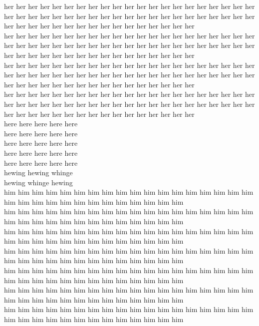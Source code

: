 her her her her her her her her her her her her her her her her her her her her her her her her her her her her her her her her her her her her her her her her her her her her her her her her her her her her her her her her her her\\
her her her her her her her her her her her her her her her her her her her her her her her her her her her her her her her her her her her her her her her her her her her her her her her her her her her her her her her her her her\\
her her her her her her her her her her her her her her her her her her her her her her her her her her her her her her her her her her her her her her her her her her her her her her her her her her her her her her her her her her\\
her her her her her her her her her her her her her her her her her her her her her her her her her her her her her her her her her her her her her her her her her her her her her her her her her her her her her her her her her her\\
here here here here here\\
here here here here here\\
here here here here here\\
here here here here here\\
here here here here here\\
hewing hewing whinge\\
hewing whinge hewing\\
him him him him him him him him him him him him him him him him him him him him him him him him him him him him him him him\\
him him him him him him him him him him him him him him him him him him him him him him him him him him him him him him him\\
him him him him him him him him him him him him him him him him him him him him him him him him him him him him him him him\\
him him him him him him him him him him him him him him him him him him him him him him him him him him him him him him him\\
him him him him him him him him him him him him him him him him him him him him him him him him him him him him him him him\\
him him him him him him him him him him him him him him him him him him him him him him him him him him him him him him him\\
him him him him him him him him him him him him him him him him him him him him him him him him him him him him him him him\\
